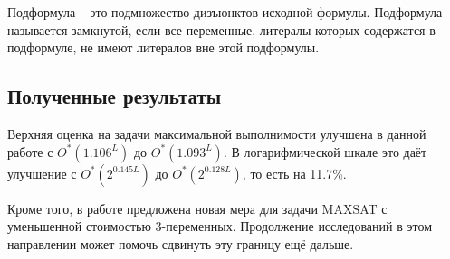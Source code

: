 Подформула -- это подмножество дизъюнктов исходной формулы. Подформула называется замкнутой, если все переменные, литералы которых содержатся в подформуле, не имеют литералов вне этой подформулы.

\subsection*{Полученные результаты}

\firstpar{}Верхняя оценка на задачи максимальной выполнимости улучшена в данной работе с $O^*(1.106^L)$ до $O^*(1.093^L)$. В логарифмической шкале это даёт улучшение с $O^*(2^{0.145L})$ до $O^*(2^{0.128L})$, то есть на 11.7\%.

Кроме того, в работе предложена новая мера для задачи MAXSAT с уменьшенной стоимостью 3-переменных. Продолжение исследований в этом направлении может помочь сдвинуть эту границу ещё дальше.


